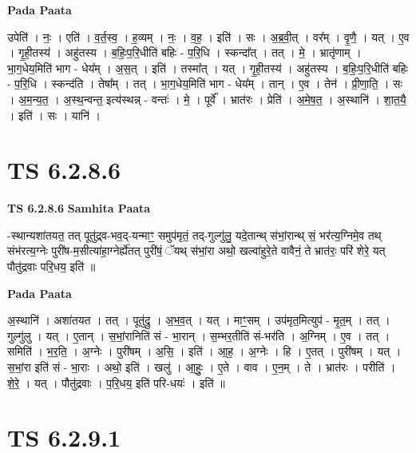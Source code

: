 \documentclass[17pt]{extarticle}
\begin{document}
\textbf{Pada Paata} \newline

उपेति॑ । नः॒ । एति॑ । व॒र्त॒स्व॒ । ह॒व्यम् । नः॒ । व॒ह॒ । इति॑ । सः । अ॒ब्र॒वी॒त् । वर᳚म् । वृ॒णै॒ । यत् । ए॒व । गृ॒ही॒तस्य॑ । अहु॑तस्य । ब॒हिः॒प॒रि॒धीति॑ बहिः - प॒रि॒धि । स्कन्दा᳚त् । तत् । मे॒ । भ्रातृ॑णाम् । भा॒ग॒धेय॒मिति॑ भाग - धेय᳚म् । अ॒स॒त् । इति॑ । तस्मा᳚त् । यत् । गृ॒ही॒तस्य॑ । अहु॑तस्य । ब॒हिः॒प॒रि॒धीति॑ बहिः - प॒रि॒धि । स्कन्द॑ति । तेषा᳚म् । तत् । भा॒ग॒धेय॒मिति॑ भाग - धेय᳚म् । तान् । ए॒व । तेन॑ । प्री॒णा॒ति॒ । सः । अ॒म॒न्य॒त॒ । अ॒स्थ॒न्वन्त॒ इत्य॑स्थन्न् - वन्तः॑ । मे॒ । पूर्वे᳚ । भ्रात॑रः । प्रेति॑ । अ॒मे॒ष॒त॒ । अ॒स्थानि॑ । शा॒त॒यै॒ । इति॑ । सः । यानि॑ ।  \newline




\section*{ TS 6.2.8.6 }

\textbf{TS 6.2.8.6 } \newline
\textbf{Samhita Paata} \newline

-स्थान्यशा॑तयत॒ तत् पूतु॑द्र्व-भव॒द्-यन्माꣳ॒॒ समुप॑मृतं॒ तद्-गुल्गु॑लु॒ यदे॒तान्थ् स॑भां॒रान्थ् सं॒ भर॑त्य॒ग्निमे॒व तथ् संभ॑रत्य॒ग्नेः पुरी॑ष-म॒सीत्या॑हा॒ग्नेर्ह्ये॑तत् पुरी॑षं॒ ॅयथ् स॑भां॒रा अथो॒ खल्वा॑हुरे॒ते वावैनं॒ ते भ्रात॑रः॒ परि॑ शेरे॒ यत् पौतु॑द्रवाः परि॒धय॒ इति॑ ॥ \newline

\textbf{Pada Paata} \newline

अ॒स्थानि॑ । अशा॑तयत । तत् । पूतु॑द्रु । अ॒भ॒व॒त् । यत् । माꣳ॒॒सम् । उप॑मृत॒मित्युप॑ - मृ॒त॒म् । तत् । गुल्गु॑लु । यत् । ए॒तान् । स॒भां॒रानिति॑ सं - भा॒रान् । स॒म्भर॒तीति॑ सं-भर॑ति । अ॒ग्निम् । ए॒व । तत् । समिति॑ । भ॒र॒ति॒ । अ॒ग्नेः । पुरी॑षम् । अ॒सि॒ । इति॑ । आ॒ह॒ । अ॒ग्नेः । हि । ए॒तत् । पुरी॑षम् । यत् । स॒भां॒रा इति॑ सं - भा॒राः । अथो॒ इति॑ । खलु॑ । आ॒हुः॒ । ए॒ते । वाव । ए॒न॒म् । ते । भ्रात॑रः । परीति॑ । शे॒रे॒ । यत् । पौतु॑द्रवाः । प॒रि॒धय॒ इति॑ परि-धयः॑ । इति॑ ॥  \newline




\section*{ TS 6.2.9.1 }
\end{document}
